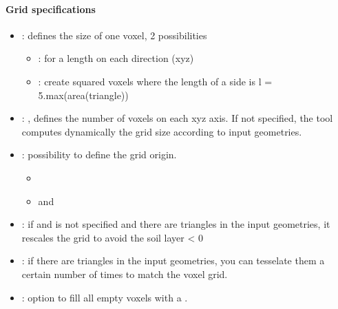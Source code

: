 \documentclass[letterpaper,10pt,english]{sphinxmanual}
\begin{document}
\paragraph{Grid specifications}
\label{\detokenize{inputs:grid-specifications}}\begin{itemize}
\item {} 
\sphinxAtStartPar
{}: defines the size of one voxel, 2 possibilities
\begin{itemize}
\item {} 
\sphinxAtStartPar
{}: for a length on each direction (xyz)

\item {} 
\sphinxAtStartPar
{}: create squared voxels where the length of a side is l = 5.max(area(triangle))

\end{itemize}

\item {} 
\sphinxAtStartPar
{}: \sphinxcode{\sphinxupquote{{[}nx, ny, nz{]}}}, defines the number of voxels on each xyz axis. If not specified, the tool computes dynamically the grid size according to input geometries.

\item {} 
\sphinxAtStartPar
{}: possibility to define the grid origin.
\begin{itemize}
\item {} 
\sphinxAtStartPar
{}

\item {} 
\sphinxAtStartPar
{} and 

\end{itemize}

\item {} 
\sphinxAtStartPar
{}: if  and  is not specified and there are triangles in the input geometries, it rescales the grid to avoid the soil layer \textless{} 0

\item {} 
\sphinxAtStartPar
{}: if there are triangles in the input geometries, you can tesselate them a certain number of times to match the voxel grid.

\item {} 
\sphinxAtStartPar
{}: option to fill all empty voxels with a .

\end{itemize}
\end{document}

